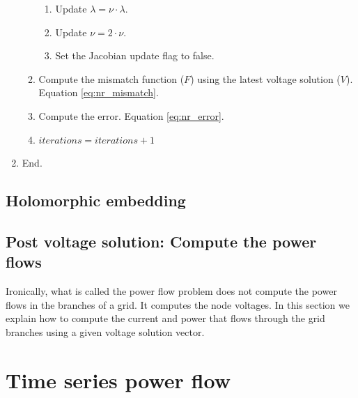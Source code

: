 \documentclass[a4paper,twoside]{tufte-book}
\begin{document}
\begin{enumerate}
\begin{enumerate}
\begin{enumerate}
		\item Update $\lambda = \nu \cdot \lambda$.
		
		\item Update $\nu = 2 \cdot \nu$.
		
		\item Set the Jacobian update flag to false.
		\end{enumerate}
	
	\item Compute the mismatch function ($F$) using the latest voltage solution ($V$). Equation \ref{eq:nr_mismatch}.
	
	\item Compute the error. Equation \ref{eq:nr_error}.
	
	\item $iterations = iterations + 1$
	\end{enumerate}

\item End.
\end{enumerate}



\section{Holomorphic embedding}


\section{Post voltage solution: Compute the power flows}

Ironically, what is called the power flow problem does not compute the power flows in the branches of a grid. It computes the node voltages. In this section we explain how to compute the current and power that flows through the grid branches using a given voltage solution vector.

\chapter{Time series power flow}



\end{document}

